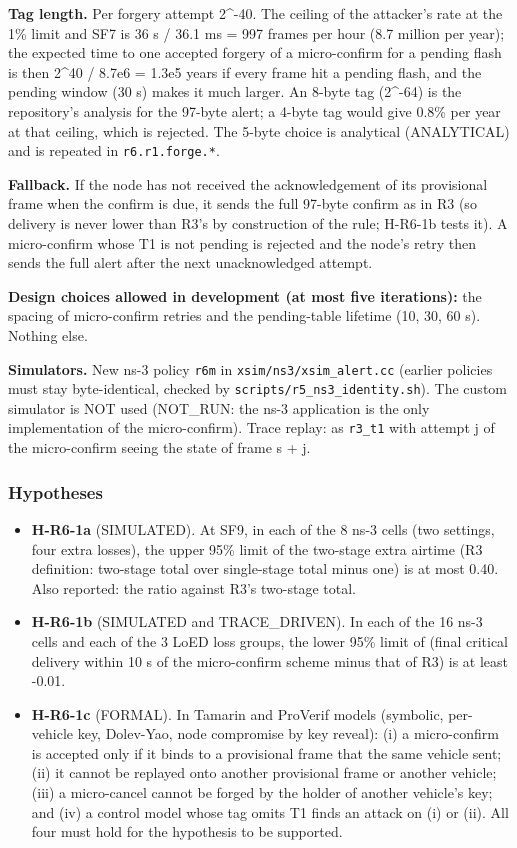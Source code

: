 \textbf{Tag length.} Per forgery attempt 2\textasciicircum{}-40. The ceiling of the attacker's rate at the 1\% limit and SF7 is 36 s / 36.1 ms = 997 frames per hour (8.7 million per year); the expected time to one accepted forgery of a micro-confirm for a pending flash is then 2\textasciicircum{}40 / 8.7e6 = 1.3e5 years if every frame hit a pending flash, and the pending window (30 s) makes it much larger. An 8-byte tag (2\textasciicircum{}-64) is the repository's analysis for the 97-byte alert; a 4-byte tag would give 0.8\% per year at that ceiling, which is rejected. The 5-byte choice is analytical (ANALYTICAL) and is repeated in \texttt{r6.r1.forge.*}.

\textbf{Fallback.} If the node has not received the acknowledgement of its provisional frame when the confirm is due, it sends the full 97-byte confirm as in R3 (so delivery is never lower than R3's by construction of the rule; H-R6-1b tests it). A micro-confirm whose T1 is not pending is rejected and the node's retry then sends the full alert after the next unacknowledged attempt.

\textbf{Design choices allowed in development (at most five iterations):} the spacing of micro-confirm retries and the pending-table lifetime (10, 30, 60 s). Nothing else.

\textbf{Simulators.} New ns-3 policy \texttt{r6m} in \texttt{xsim/ns3/xsim\_alert.cc} (earlier policies must stay byte-identical, checked by \texttt{scripts/r5\_ns3\_identity.sh}). The custom simulator is NOT used (NOT\_RUN: the ns-3 application is the only implementation of the micro-confirm). Trace replay: as \texttt{r3\_t1} with attempt j of the micro-confirm seeing the state of frame s + j.

\subsubsection*{Hypotheses}

\begin{itemize}
\item \textbf{H-R6-1a} (SIMULATED). At SF9, in each of the 8 ns-3 cells (two settings, four extra losses), the upper 95\% limit of the two-stage extra airtime (R3 definition: two-stage total over single-stage total minus one) is at most 0.40. Also reported: the ratio against R3's two-stage total.
\item \textbf{H-R6-1b} (SIMULATED and TRACE\_DRIVEN). In each of the 16 ns-3 cells and each of the 3 LoED loss groups, the lower 95\% limit of (final critical delivery within 10 s of the micro-confirm scheme minus that of R3) is at least -0.01.
\item \textbf{H-R6-1c} (FORMAL). In Tamarin and ProVerif models (symbolic, per-vehicle key, Dolev-Yao, node compromise by key reveal): (i) a micro-confirm is accepted only if it binds to a provisional frame that the same vehicle sent; (ii) it cannot be replayed onto another provisional frame or another vehicle; (iii) a micro-cancel cannot be forged by the holder of another vehicle's key; and (iv) a control model whose tag omits T1 finds an attack on (i) or (ii). All four must hold for the hypothesis to be supported.
\end{itemize}

